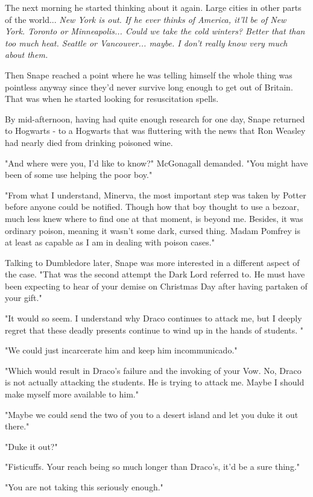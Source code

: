 \documentclass[a4paper,11pt]{article}
\begin{document}
The next morning he started thinking about it again. Large cities in other parts of the world... \emph{New York is out. If he ever thinks of America, it'll be of New York. Toronto or Minneapolis... Could we take the cold winters? Better that than too much heat. Seattle or Vancouver... maybe. I don't really know very much about them.}

Then Snape reached a point where he was telling himself the whole thing was pointless anyway since they'd never survive long enough to get out of Britain. That was when he started looking for resuscitation spells.

By mid-afternoon, having had quite enough research for one day, Snape returned to Hogwarts - to a Hogwarts that was fluttering with the news that Ron Weasley had nearly died from drinking poisoned wine.

"And where were you, I'd like to know?" McGonagall demanded. "You might have been of some use helping the poor boy."

"From what I understand, Minerva, the most important step was taken by Potter before anyone could be notified. Though how that boy thought to use a bezoar, much less knew where to find one at that moment, is beyond me. Besides, it was ordinary poison, meaning it wasn't some dark, cursed thing. Madam Pomfrey is at least as capable as I am in dealing with poison cases."

Talking to Dumbledore later, Snape was more interested in a different aspect of the case. "That was the second attempt the Dark Lord referred to. He must have been expecting to hear of your demise on Christmas Day after having partaken of your gift."

"It would so seem. I understand why Draco continues to attack me, but I deeply regret that these deadly presents continue to wind up in the hands of students. "

"We could just incarcerate him and keep him incommunicado."

"Which would result in Draco's failure and the invoking of your Vow. No, Draco is not actually attacking the students. He is trying to attack me. Maybe I should make myself more available to him."

"Maybe we could send the two of you to a desert island and let you duke it out there."

"Duke it out?"

"Fisticuffs. Your reach being so much longer than Draco's, it'd be a sure thing."

"You are not taking this seriously enough."
\end{document}
